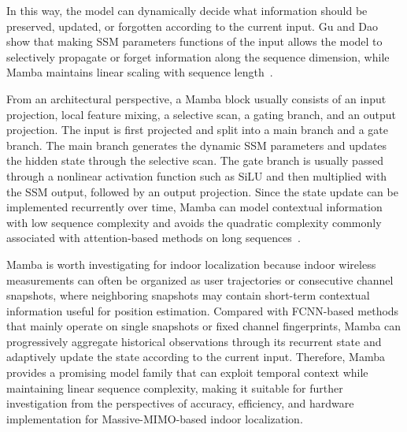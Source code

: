 \documentclass[11pt,twoside]{eitExjobb}
\begin{document}
In this way, the model can dynamically decide what information should be
preserved, updated, or forgotten according to the current input. Gu and Dao show that making SSM parameters functions of the input allows the
model to selectively propagate or forget information along the sequence dimension,
while Mamba maintains linear scaling with sequence length~\cite{cite:Mamba2023}.


From an architectural perspective, a Mamba block usually consists of an input
projection, local feature mixing, a selective scan, a gating branch, and an output
projection. The input is first projected and split into a main branch and a gate
branch. The main branch generates the dynamic SSM parameters and updates the hidden
state through the selective scan. The gate branch is usually passed through a nonlinear
activation function such as SiLU and then multiplied with the SSM output, followed by
an output projection. Since the state update can be implemented recurrently over time,
Mamba can model contextual information with low sequence complexity and avoids the
quadratic complexity commonly associated with attention-based methods on long
sequences~\cite{cite:Mamba2023}.


Mamba is worth investigating for indoor localization because indoor wireless
measurements can often be organized as user trajectories or consecutive channel
snapshots, where neighboring snapshots may contain short-term contextual information
useful for position estimation. Compared with FCNN-based methods that mainly operate on
single snapshots or fixed channel fingerprints, Mamba can progressively aggregate
historical observations through its recurrent state and adaptively update the state
according to the current input. Therefore, Mamba provides a promising model family that
can exploit temporal context while maintaining linear sequence complexity, making it
suitable for further investigation from the perspectives of accuracy, efficiency, and
hardware implementation for Massive-MIMO-based indoor localization.
\end{document}
